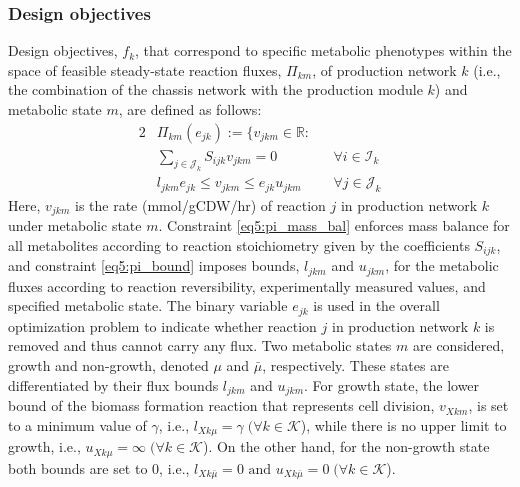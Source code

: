 \subsubsection{Design objectives} \label{sec:do}

Design objectives, $f_k$, that correspond to specific metabolic phenotypes within the space of feasible steady-state reaction fluxes, $\Pi_{km}$, of production network $k$ (i.e., the combination of the chassis network with the production module $k$) and metabolic state $m$, are defined as follows:
\begin{alignat}{2}
		& \Pi_{km}(e_{jk}):=\{v_{jkm}\in\mathbb{R}: \\
		&	\sum_{j\in \mathcal{J}_k} S_{ijk} v_{jkm} =0  && \forall i\in \mathcal{I}_k 		\label{eq5:pi_mass_bal}\\
		& l_{jkm} e_{jk}  \le v_{jkm} \le e_{jk} u_{jkm} \;  && \forall j\in \mathcal{J}_k 			\label{eq5:pi_bound}%
\end{alignat}
\noindent Here, $v_{jkm}$ is the rate (mmol/gCDW/hr) of reaction $j$ in production network $k$ under metabolic state $m$.
Constraint \eqref{eq5:pi_mass_bal} enforces mass balance for all metabolites according to reaction stoichiometry given by the coefficients $S_{ijk}$, and constraint \eqref{eq5:pi_bound} imposes bounds, $l_{jkm}$ and $u_{jkm}$, for the metabolic fluxes according to reaction reversibility, experimentally measured values, and specified metabolic state.
The binary variable $e_{jk}$ is used in the overall optimization problem to indicate whether reaction $j$ in production network $k$ is removed and thus cannot carry any flux. Two metabolic states $m$ are considered, growth and non-growth, denoted $\mu$  and $\bar{\mu}$, respectively. These states are differentiated by their   flux bounds $l_{jkm}$ and $u_{jkm}$. For growth state, the lower bound of the biomass formation reaction that represents cell division, $v_{Xkm}$, is set to a minimum value of  $\gamma$, i.e., $l_{Xk\mu} = \gamma \; (\forall k \in \mathcal{K}$), while there is no upper limit to growth, i.e., $u_{Xk\mu} = \infty \; (\forall k \in \mathcal{K}$).
On the other hand, for the non-growth state both bounds are set to 0, i.e., $l_{Xk\bar{\mu}} = 0 \text{ and } u_{Xk\bar{\mu}}= 0 \; (\forall k \in \mathcal{K}$).

